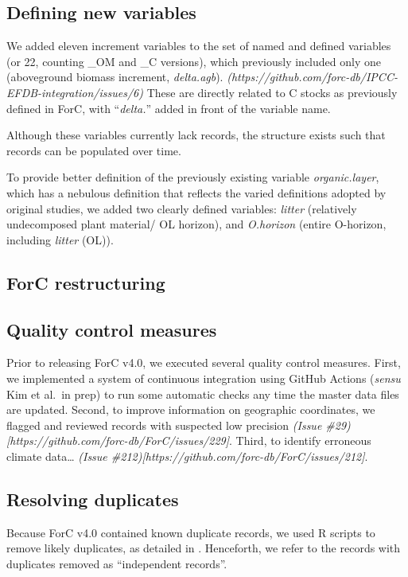 \documentclass[, manuscript]{copernicus}
\begin{document}
\subsection{Defining new variables}

We added eleven increment variables to the set of named and defined
variables (or 22, counting \_OM and \_C versions), which previously
included only one (aboveground biomass increment, \emph{delta.agb}).
\emph{(https://github.com/forc-db/IPCC-EFDB-integration/issues/6)} These
are directly related to C stocks as previously defined in ForC, with
``\emph{delta.}'' added in front of the variable name.

Although these variables currently lack records, the structure exists
such that records can be populated over time.

To provide better definition of the previously existing variable
\emph{organic.layer}, which has a nebulous definition that reflects the
varied definitions adopted by original studies, we added two clearly
defined variables: \emph{litter} (relatively undecomposed plant
material/ OL horizon), and \emph{O.horizon} (entire O-horizon, including
\emph{litter} (OL)).

\subsection{ForC restructuring}

\subsection{Quality control measures}

Prior to releasing ForC v4.0, we executed several quality control
measures. First, we implemented a system of continuous integration using
GitHub Actions (\emph{sensu} Kim et al.~in prep) to run some automatic
checks any time the master data files are updated. Second, to improve
information on geographic coordinates, we flagged and reviewed records
with suspected low precision \emph{(Issue
\#29){[}https://github.com/forc-db/ForC/issues/229{]}}. Third, to
identify erroneous climate data\ldots{} \emph{(Issue
\#212){[}https://github.com/forc-db/ForC/issues/212{]}}.

\subsection{Resolving duplicates}

Because ForC v4.0 contained known duplicate records, we used R scripts
to remove likely duplicates, as detailed in
\citet{anderson-teixeira_carbon_2021}. Henceforth, we refer to the
records with duplicates removed as ``independent records''.
\end{document}
